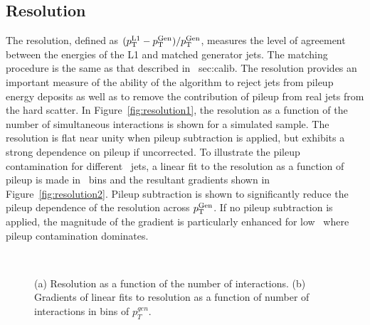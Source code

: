 \subsection{Resolution}

The resolution, defined as $({p_{\text T}^{\text{L1}}}-{p_{\text T}^{\text{Gen}}})/{p_{\text T}^{\text{Gen}}}$, measures the level of agreement between the energies of the 
L1 and matched generator jets. The matching procedure is the same as that described in \Section~{sec:calib}.
The resolution provides an important measure of the ability of the algorithm to reject jets from pileup
energy deposits as well as to remove the contribution of pileup from real jets from the hard scatter.
In Figure~\ref{fig:resolution1}, the resolution as a function of the number of simultaneous interactions is shown for
a simulated \ttbar sample. The resolution is flat near unity when pileup subtraction is applied,
but exhibits a strong dependence on pileup if uncorrected. To illustrate the pileup contamination for different
\Genpt~jets, a linear fit to the resolution as a function of pileup is made in \Genpt~bins and the resultant gradients
shown in Figure~\ref{fig:resolution2}. Pileup subtraction is shown to significantly reduce the 
pileup dependence of the resolution across ${p_{\text T}^{\text{Gen}}}$. If no pileup subtraction is applied, 
the magnitude of the gradient is particularly enhanced for low \Genpt~where pileup contamination dominates. 

\begin{figure}
    \begin{center} 
	~
	\caption{(a) Resolution as a function of the number of interactions. (b) Gradients of linear fits to 
	    resolution as a function of number of interactions in bins of $p^{gen}_{T}$.}
	    \label{fig:label:resolution}
    \end{center} 
\end{figure}

